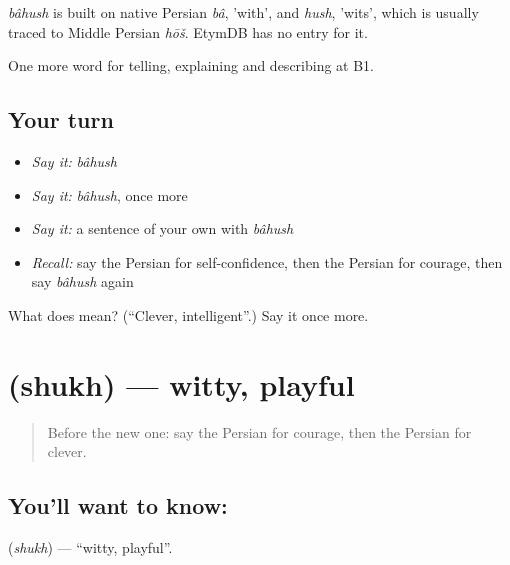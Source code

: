 \begin{cousinweb}
\emph{bâhush} is built on native Persian \emph{bâ}, 'with', and \emph{hush}, 'wits', which is usually traced to Middle Persian \emph{hōš}. EtymDB has no entry for it.
\end{cousinweb}

\begin{grammarlens}[title={What you've built}]
One more word for telling, explaining and describing at B1.
\end{grammarlens}

\subsection*{Your turn}
\begin{itemize}
\raggedright
  \item \emph{Say it:} \emph{bâhush}
  \item \emph{Say it:} \emph{bâhush}, once more
  \item \emph{Say it:} a sentence of your own with \emph{bâhush}
  \item \emph{Recall:} say the Persian for self-confidence, then the Persian for courage, then say \emph{bâhush} again
\end{itemize}

\begin{tcolorbox}[breakable,colback=teal!4,colframe=teal!35!black,title={Before you move on}]
What does  mean? (\textquotedblleft{}Clever, intelligent\textquotedblright{}.) Say it once more.
\end{tcolorbox}
\section[\texorpdfstring{\fa{شوخ} (shukh)}{شوخ (shukh)}]{ (shukh) — witty, playful}

\label{lesson:FA-C488-shukh}



\begin{quote}
Before the new one: say the Persian for courage, then the Persian for clever.
\end{quote}

\subsection*{You'll want to know: }
\textbf{} (\emph{shukh}) — \textquotedblleft{}witty, playful\textquotedblright{}.

